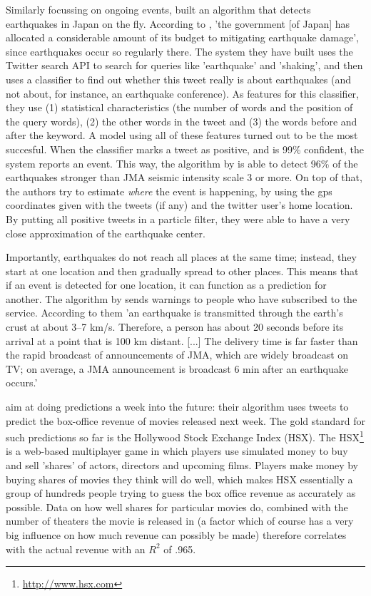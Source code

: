 \documentclass[12pt]{article}
\begin{document}
Similarly focussing on ongoing events,  built an algorithm that detects earthquakes in Japan on the fly. According to , 'the government [of Japan] has allocated a considerable amount of its budget to mitigating earthquake damage', since earthquakes occur so regularly there. The system they have built uses the Twitter search API to search for queries like 'earthquake' and 'shaking', and then uses a classifier to find out whether this tweet really is about earthquakes (and not about, for instance, an earthquake conference). As features for this classifier, they use (1) statistical characteristics (the number of words and the position of the query words), (2) the other words in the tweet and (3) the words before and after the keyword. A model using all of these features turned out to be the most succesful. When the classifier marks a tweet as positive, and is 99\% confident, the system reports an event. This way, the algorithm by  is able to detect 96\% of the earthquakes stronger than JMA seismic intensity scale 3 or more. On top of that, the authors try to estimate \emph{where} the event is happening, by using the gps coordinates given with the tweets (if any) and the twitter user's home location. By putting all positive tweets in a particle filter, they were able to have a very close approximation of the earthquake center. %

Importantly, earthquakes do not reach all places at the same time; instead, they start at one location and then gradually spread to other places. This means that if an event is detected for one location, it can function as a prediction for another. The algorithm by  sends warnings to people who have subscribed to the service. According to them 'an earthquake is transmitted through the earth’s crust at about 3–7 km/s. Therefore, a person has about 20 seconds before its arrival at a point that is 100 km distant. [...] The delivery time is far faster than the rapid broadcast of announcements of JMA, which are widely broadcast on TV; on average, a JMA announcement is broadcast 6 min after an earthquake occurs.'

 aim at doing predictions a week into the future: their algorithm uses tweets to predict the box-office revenue of movies released next week. The gold standard for such predictions so far is the Hollywood Stock Exchange Index (HSX). The HSX\footnote{\url{http://www.hsx.com}} is a web-based multiplayer game in which players use simulated money to buy and sell 'shares' of actors, directors and upcoming films. Players make money by buying shares of movies they think will do well, which makes HSX essentially a group of hundreds people trying to guess the box office revenue as accurately as possible. Data on how well shares for particular movies do, combined with the number of theaters the movie is released in (a factor which of course has a very big influence on how much revenue can possibly be made) therefore correlates with the actual revenue with an $R^2$ of .965.
\end{document}
